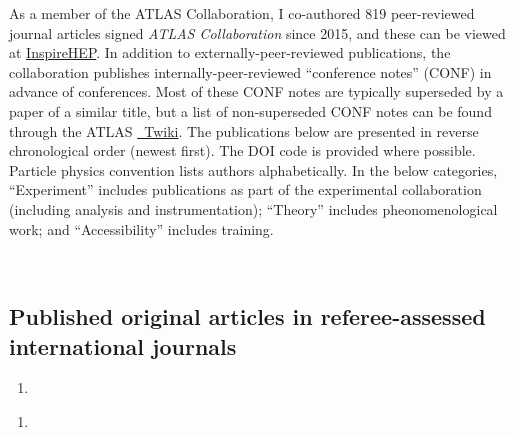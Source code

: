 \noindent As a member of the ATLAS Collaboration, I co-authored 819 peer-reviewed journal articles signed \textsl{ATLAS Collaboration} since 2015, and these can be viewed at \href{https://inspirehep.net/authors/1319078}{InspireHEP}.
In addition to externally-peer-reviewed publications, the collaboration publishes internally-peer-reviewed \enquote{conference notes} (CONF) in advance of conferences.
Most of these CONF notes are typically superseded by a paper of a similar title, but a list of non-superseded CONF notes can be found through the ATLAS \href{https://twiki.cern.ch/twiki/bin/view/AtlasPublic/CONFnotes}{~Twiki}.
The publications below are presented in reverse chronological order (newest first).
The DOI code is provided where possible.
Particle physics convention lists authors alphabetically.
In the below categories, \enquote{Experiment} includes publications as part of the experimental collaboration (including analysis and instrumentation); \enquote{Theory} includes pheonomenological work; and \enquote{Accessibility} includes training.

\begin{center}
	~%
	~%
	~%
	~%
\end{center}

\subsection{Published original articles in referee-assessed international journals}\label{ssec:published-original-articles-in-referee-assessed-international-journals}

\setcounter{enumi}{0}
\begin{enumerate}[label=\PubCite{darkgray}{white}{\arabic*},resume]
	\item {}
\end{enumerate}

\begin{enumerate}[label=\PubCite{blue}{white}{\arabic*},resume]
	\item {}
\end{enumerate}

